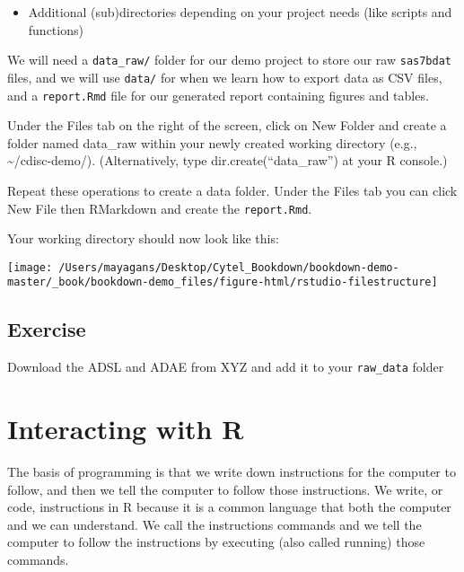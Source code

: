 \documentclass[]{book}
\providecommand{\tightlist}{%
  \setlength{\itemsep}{0pt}\setlength{\parskip}{0pt}}
\begin{document}
\begin{itemize}
\tightlist
\item
  Additional (sub)directories depending on your project needs (like scripts and functions)
\end{itemize}

We will need a \texttt{data\_raw/} folder for our demo project to store our raw \texttt{sas7bdat} files, and we will use \texttt{data/} for when we learn how to export data as CSV files, and a \texttt{report.Rmd} file for our generated report containing figures and tables.

Under the Files tab on the right of the screen, click on New Folder and create a folder named data\_raw within your newly created working directory (e.g., \textasciitilde{}/cdisc-demo/). (Alternatively, type dir.create(``data\_raw'') at your R console.)

Repeat these operations to create a data folder. Under the Files tab you can click New File then RMarkdown and create the \texttt{report.Rmd}.

Your working directory should now look like this:

\begin{center}\texttt{[image: /Users/mayagans/Desktop/Cytel\_Bookdown/bookdown-demo-master/\_book/bookdown-demo\_files/figure-html/rstudio-filestructure]} \end{center}

\hypertarget{exercise}{%
\section{Exercise}\label{exercise}}

Download the ADSL and ADAE from XYZ and add it to your \texttt{raw\_data} folder

\hypertarget{interacting-with-r}{%
\chapter{Interacting with R}\label{interacting-with-r}}

The basis of programming is that we write down instructions for the computer to follow, and then we tell the computer to follow those instructions. We write, or code, instructions in R because it is a common language that both the computer and we can understand. We call the instructions commands and we tell the computer to follow the instructions by executing (also called running) those commands.
\end{document}
